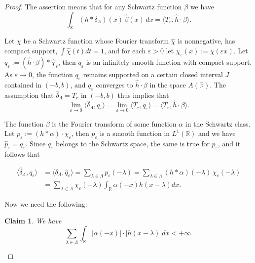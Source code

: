 \documentclass[reqno,a4paper,12pt]{amsart}
\numberwithin{equation}{section}
\numberwithin{figure}{section}
\newcommand\R{\mathbb{R}}
\newcommand\lam{\lambda}
\newcommand\Lam{\Lambda}
\newcommand\1{\mathds{1}}
\newcommand\eps{\varepsilon}
\newcommand{\ft}[1]{\widehat{#1}}
\newcommand{\dotprod}[2]{\langle #1 , #2 \rangle}
\theoremstyle{plain}
\newtheorem*{claim*}{Claim}
\theoremstyle{definition}
\begin{document}
\begin{proof}
The assertion means that for any
Schwartz function $\beta$ we have
\begin{equation}
  \label{eqP1.10}
\int_{\R} (h \ast \delta_\Lam)(x) \, \ft{\beta}(x) \, dx = 
\dotprod{T_r}{\ft{h} \cdot \beta}.
\end{equation}


Let $\chi$ be a Schwartz function whose Fourier transform
$\ft{\chi}$ is nonnegative, has compact support,
 $\int \ft{\chi}(t) dt =1$, and for each $\eps > 0$ let
$\chi_\eps(x) := \chi( \eps x)$. Let
$q_\eps := (\ft{h} \cdot \beta) \ast \ft{\chi}_\eps$,
then $q_\eps$ is an infinitely smooth function with compact support.
As $\eps \to 0$, the function $q_\eps$ remains supported on
a certain closed interval $J$ contained in $(-b,b)$, and
$q_\eps$ converges to 
$\ft{h}\cdot   \beta$ in the space $A(\R)$. The assumption that
 $\ft{\delta}_\Lam = T_r$ in $(-b,b)$ thus implies that
\begin{equation}
  \label{eqR12.3}
\lim_{\eps \to 0} \dotprod{\ft{\delta}_\Lam}{q_\eps} = 
\lim_{\eps \to 0} \dotprod{T_r}{q_\eps} = 
\dotprod{T_r}{\ft{h}\cdot  \beta}.
\end{equation}


The function $\beta$ is the Fourier transform of some function
$\alpha$ in the Schwartz class. Let $p_\eps := (h \ast \alpha) \cdot \chi_\eps$,
then $p_\eps$ is a smooth function in $L^1(\R)$ and
we have $\ft{p}_\eps = q_\eps$.
Since $q_\eps$ belongs to the Schwartz 
space, the same is true for $p_\eps$, and it follows that

\begin{align}
\dotprod{\ft{\delta}_\Lam}{q_\eps} &= \dotprod{\delta_\Lam}{\ft{q}_\eps}
= \sum_{\lambda\in\Lambda}  {p_\eps}(-\lam)
= \sum_{\lambda\in\Lambda}
   (h \ast \alpha)(-\lam) \, \chi_\eps(-\lam)\nonumber\\
&=\sum_{\lambda\in\Lambda} \chi_\eps(-\lam) \int_{\mathbb R}\alpha(-x) h(x-\lambda)dx.
  \label{eqR12.7}
\end{align}




Now we need the following:
\begin{claim*}
We have
\begin{equation}\label{eqR14.21}
\sum_{\lambda\in\Lambda} 
 \int_{\mathbb R}|\alpha(-x)|\cdot|h(x-\lambda)|dx<+\infty.
\end{equation}
\end{claim*}
 


\end{proof}
\end{document}
